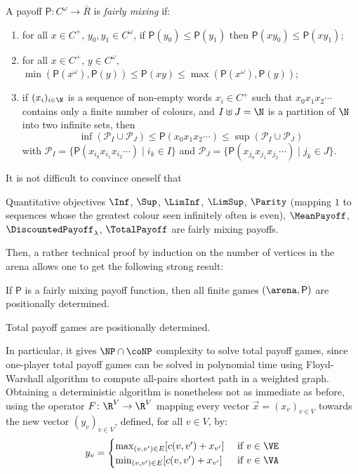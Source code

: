 \begin{definition}\label{4-def:fairly-mixing}
  A payoff $\mathsf{P}\colon C^\omega\to \overline R$ is \emph{fairly
    mixing} if:
  \begin{enumerate}
  \item for all $x\in C^+$, $y_0,y_1\in C^\omega$, if
    $\mathsf{P}(y_0)\leq \mathsf{P}(y_1)$ then
    $\mathsf{P}(xy_0)\leq \mathsf{P}(xy_1)$;
  \item for all $x\in C^+$, $y\in C^\omega$,
    $\min(\mathsf{P}(x^\omega),\mathsf{P}(y)) \leq \mathsf{P}(xy)\leq
    \max(\mathsf{P}(x^\omega),\mathsf{P}(y))$;
  \item if $(x_i)_{i\in \N}$ is a sequence of non-empty words
    $x_i\in C^+$ such that $x_0x_1x_2\cdots$ contains only a finite
    number of colours, and $I\uplus J=\N$ is a partition of $\N$ into two
    infinite sets, then
    \[\inf(\mathcal{P}_I\cup \mathcal{P}_J) \leq
      \mathsf{P}(x_0x_1x_2\cdots) \leq \sup(\mathcal{P}_I\cup
      \mathcal{P}_J)\] with
    $\mathcal P_I=\{\mathsf{P}(x_{i_0}x_{i_1}x_{i_2}\cdots)\mid i_k\in
    I\}$ and
    $\mathcal{P}_J=\{\mathsf{P}(x_{j_0}x_{j_1}x_{j_2}\cdots)\mid
    j_k\in J\}$.
  \end{enumerate}
\end{definition}

It is not difficult to convince oneself that
\begin{proposition}\label{4-prop:objectives-fairly}
  Quantitative objectives $\Inf$, $\Sup$, $\LimInf$, $\LimSup$,
  $\Parity$ (mapping $1$ to sequences whose the greatest colour seen
  infinitely often is even), $\MeanPayoff$,
  $\DiscountedPayoff_\lambda$, $\TotalPayoff$ are fairly mixing
  payoffs.
\end{proposition}

Then, a rather technical proof by induction on the number of vertices
in the arena allows one to get the following strong result:
\begin{theorem}\label{4-thm:fairly-mixing}
  If $\mathsf P$ is a fairly mixing payoff function, then all finite
  games $(\arena,\mathsf P)$ are positionally determined.
\end{theorem}

\begin{corollary}\label{4-cor:TP-determinacy}
  Total payoff games are positionally determined.
\end{corollary}

In particular, it gives $\NP\cap\coNP$ complexity to solve
total payoff games, since one-player total payoff games can be solved
in polynomial time using Floyd-Warshall algorithm to compute all-pairs
shortest path in a weighted graph. Obtaining a deterministic algorithm
is nonetheless not as immediate as before, using the operator
$F\colon \R^V\to \R^V$ mapping every vector $\vec x=(x_v)_{v\in V}$
towards the new vector $(y_v)_{v\in V}$, defined, for all $v\in V$,
by:
\[y_v =
  \begin{cases}
    \max_{(v,v')\in E} [c(v,v') + x_{v'}] &
    \text{ if } v\in \VE\\
    \min_{(v,v')\in E} [c(v,v') + x_{v'}] & \text{ if } v\in \VA
  \end{cases}\]

